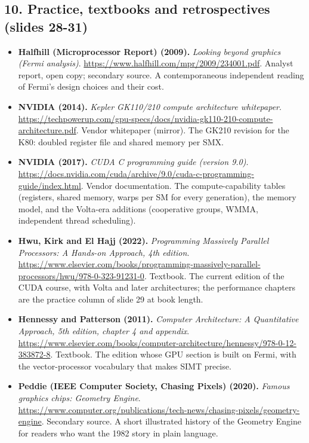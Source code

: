 \subsection*{10. Practice, textbooks and retrospectives (slides 28-31)}
\begin{itemize}[leftmargin=1.2em,itemsep=3pt]\sloppy
\item \textbf{Halfhill (Microprocessor Report) (2009).} \textit{Looking beyond graphics (Fermi analysis)}. \url{https://www.halfhill.com/mpr/2009/234001.pdf}. Analyst report, open copy; secondary source. A contemporaneous independent reading of Fermi's design choices and their cost.
\item \textbf{NVIDIA (2014).} \textit{Kepler GK110/210 compute architecture whitepaper}. \url{https://techpowerup.com/gpu-specs/docs/nvidia-gk110-210-compute-architecture.pdf}. Vendor whitepaper (mirror). The GK210 revision for the K80: doubled register file and shared memory per SMX.
\item \textbf{NVIDIA (2017).} \textit{CUDA C programming guide (version 9.0)}. \url{https://docs.nvidia.com/cuda/archive/9.0/cuda-c-programming-guide/index.html}. Vendor documentation. The compute-capability tables (registers, shared memory, warps per SM for every generation), the memory model, and the Volta-era additions (cooperative groups, WMMA, independent thread scheduling).
\item \textbf{Hwu, Kirk and El Hajj (2022).} \textit{Programming Massively Parallel Processors: A Hands-on Approach, 4th edition}. \url{https://www.elsevier.com/books/programming-massively-parallel-processors/hwu/978-0-323-91231-0}. Textbook. The current edition of the CUDA course, with Volta and later architectures; the performance chapters are the practice column of slide 29 at book length.
\item \textbf{Hennessy and Patterson (2011).} \textit{Computer Architecture: A Quantitative Approach, 5th edition, chapter 4 and appendix}. \url{https://www.elsevier.com/books/computer-architecture/hennessy/978-0-12-383872-8}. Textbook. The edition whose GPU section is built on Fermi, with the vector-processor vocabulary that makes SIMT precise.
\item \textbf{Peddie (IEEE Computer Society, Chasing Pixels) (2020).} \textit{Famous graphics chips: Geometry Engine}. \url{https://www.computer.org/publications/tech-news/chasing-pixels/geometry-engine}. Secondary source. A short illustrated history of the Geometry Engine for readers who want the 1982 story in plain language.
\end{itemize}
